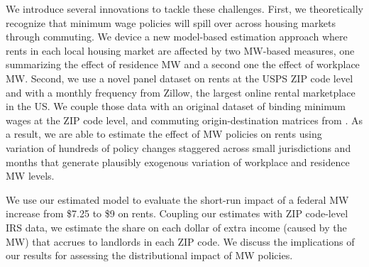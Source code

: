 
We introduce several innovations to tackle these challenges.
First, we theoretically recognize that minimum wage policies will spill over across
housing markets through commuting.
We device a new model-based estimation approach where rents in each local housing 
market are affected by two MW-based measures, one summarizing the effect of 
residence MW and a second one the effect of workplace MW.
Second, we use a novel panel dataset on rents at the USPS ZIP code level and with 
a monthly frequency from Zillow, the largest online rental marketplace in the US.
We couple those data with an original dataset of binding minimum wages at the
ZIP code level, and commuting origin-destination matrices from \textcite{LODES}.
As a result, we are able to estimate the effect of MW policies on rents using 
variation of hundreds of policy changes staggered across small jurisdictions and 
months that generate plausibly exogenous variation of workplace and residence MW
levels.

We use our estimated model to evaluate the short-run impact of a federal MW 
increase from \$7.25 to \$9 on rents.
Coupling our estimates with ZIP code-level IRS data, we estimate the share on 
each dollar of extra income (caused by the MW) that accrues to landlords in each 
ZIP code.
We discuss the implications of our results for assessing the distributional 
impact of MW policies.


